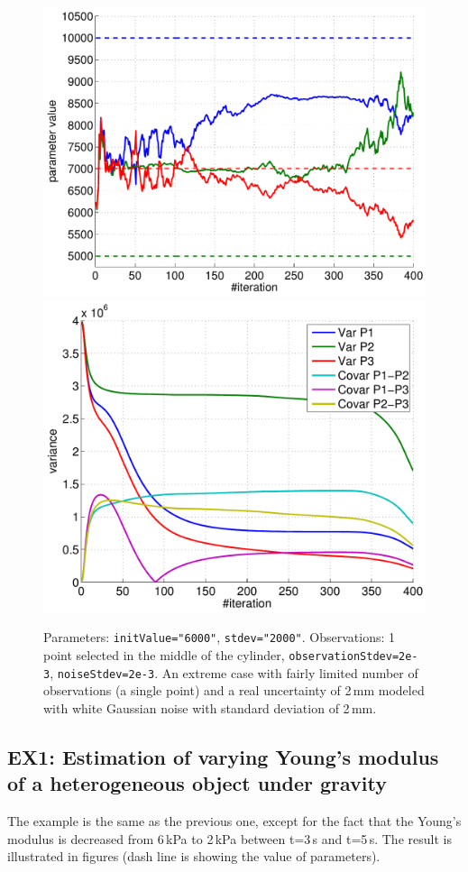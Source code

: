 \documentclass[10pt]{article}
\begin{document}
\begin{figure}[h]
\begin{center}
\includegraphics[width=.49\linewidth]{figures/p6_estim.pdf}
\hfill
\includegraphics[width=.49\linewidth]{figures/p6_var.pdf}
\caption{Parameters: \texttt{initValue="6000"}, \texttt{stdev="2000"}. Observations: 1 point selected in the middle of the cylinder,
\texttt{observationStdev=2e-3}, \texttt{noiseStdev=2e-3}. An extreme case with fairly limited number of observations (a single point) and a real
uncertainty of 2\,mm modeled with white Gaussian noise with standard deviation of 2\,mm.}
\label{fig:Results6}
\end{center}
\end{figure}

\subsection{EX1: Estimation of varying Young's modulus of a heterogeneous object under gravity}
The example is the same as the previous one, except for the fact that the Young's modulus is decreased from 6\,kPa to 2\,kPa between t=3\,s and t=5\,s.
The result is illustrated in figures (dash line is showing the value of parameters).
\end{document}
